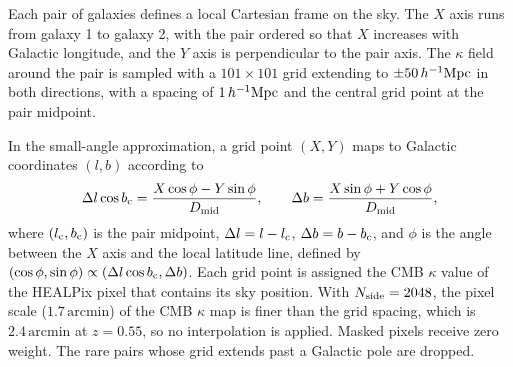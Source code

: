 \documentclass[11pt,letterpaper]{article}
\newcommand{\hinvMpc}{h^{-1}{\rm Mpc}}
\begin{document}

Each pair of galaxies defines a local Cartesian frame on the sky. The $X$ axis runs from
galaxy 1 to galaxy 2, with the pair ordered so that $X$ increases with
Galactic longitude, and the $Y$ axis is perpendicular to the pair axis. 
The $\kappa$ field around the pair is sampled with a $101\times101$ grid extending
to $\pm50\,\hinvMpc$ in both directions, with a spacing of
$1\,\hinvMpc$ and the central grid point at the pair midpoint.

In the small-angle approximation, a grid point $(X,Y)$ maps to Galactic coordinates $(l, b)$ according to
\begin{equation}
  \Delta l\cos b_{\rm c} = \frac{X\cos\phi - Y\sin\phi}{D_{\rm mid}}, \qquad
  \Delta b = \frac{X\sin\phi + Y\cos\phi}{D_{\rm mid}},
  \label{eq:grid_to_sky}
\end{equation}
where $(l_{\rm c},b_{\rm c})$ is the pair midpoint, $\Delta l = l-l_{\rm c}$, $\Delta b = b-b_{\rm c}$, and $\phi$ is the angle between the $X$ axis and the local latitude line, defined by
$(\cos\phi,\sin\phi)\propto(\Delta l\cos b_{\rm c},\Delta b)$.
Each grid point is assigned the CMB $\kappa$ value of the HEALPix pixel that contains its sky position. With $N_{\rm side}=2048$, the pixel scale ($1.7\,\mathrm{arcmin}$) of the CMB $\kappa$ map is
finer than the grid spacing, which is $2.4\,\mathrm{arcmin}$ at $z=0.55$,
so no interpolation is applied. Masked pixels receive zero weight. The rare
pairs whose grid extends past a Galactic pole are dropped.
\end{document}
